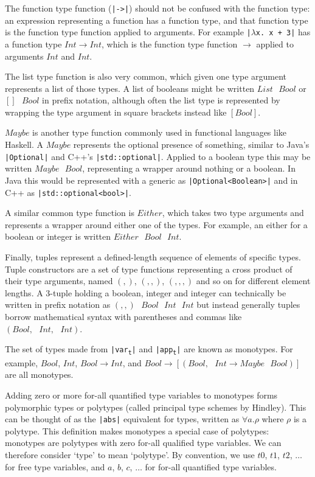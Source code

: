 \documentclass[a4paper,fleqn,twoside,12pt]{report}
\begin{document}
The function type function (\texttt{|->|}) should not be confused with the function type: an expression representing a function has a function type, and that function type is the function type function applied to arguments. For example \texttt{|$\lambda$x. x + 3|} has a function type $Int \rightarrow Int$, which is the function type function $\rightarrow$ applied to arguments $Int$ and $Int$.

The list type function is also very common, which given one type argument represents a list of those types. A list of booleans might be written $List\text{ }Bool$ or $[]\text{ }Bool$ in prefix notation, although often the list type is represented by wrapping the type argument in square brackets instead like $[Bool]$.

$Maybe$ is another type function commonly used in functional languages like Haskell. A $Maybe$ represents the optional presence of something, similar to Java’s \texttt{|Optional|} and C++’s \texttt{|std::optional|}. Applied to a boolean type this may be written $Maybe\text{ }Bool$, representing a wrapper around nothing or a boolean. In Java this would be represented with a generic as \texttt{|Optional<Boolean>|} and in C++ as \texttt{|std::optional<bool>|}.

A similar common type function is $Either$, which takes two type arguments and represents a wrapper around either one of the types. For example, an either for a boolean or integer is written $Either\text{ }Bool\text{ }Int$.

Finally, tuples represent a defined-length sequence of elements of specific types. Tuple constructors are a set of type functions representing a cross product of their type arguments, named $(,)$, $(,,)$, $(,,,)$ and so on for different element lengths. A 3-tuple holding a boolean, integer and integer can technically be written in prefix notation as $(,,)\text{ }Bool\text{ }Int\text{ }Int$ but instead generally tuples borrow mathematical syntax with parentheses and commas like $(Bool,\text{ }Int,\text{ }Int)$.

The set of types made from \texttt{|var\textsubscript{t}|} and \texttt{|app\textsubscript{t}|} are known as monotypes. For example, $Bool$, $Int$, $Bool \rightarrow Int$, and $Bool \rightarrow [(Bool,\text{ }Int \rightarrow Maybe\text{ }Bool)]$ are all monotypes.

Adding zero or more for-all quantified type variables to monotypes forms polymorphic types or polytypes (called principal type schemes by Hindley). This can be thought of as the \texttt{|abs|} equivalent for types, written as $\forall a. \rho$ where $\rho$ is a polytype. This definition makes monotypes a special case of polytypes: monotypes are polytypes with zero for-all qualified type variables. We can therefore consider ‘type’ to mean ‘polytype’. By convention, we use $t0$, $t1$, $t2$, $\dots$ for free type variables, and $a$, $b$, $c$, $\dots$ for for-all quantified type variables.
\end{document}
